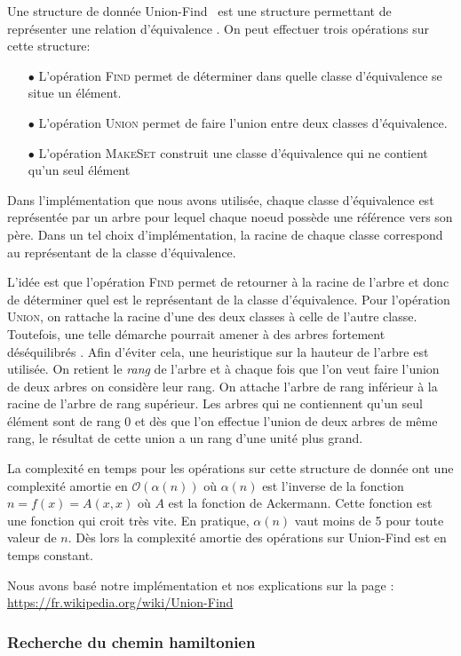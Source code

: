 Une structure de donnée \og Union-Find \fg~est une structure permettant de représenter une relation d'équivalence . On peut effectuer trois opérations sur cette structure:
\begin{itemize}
\item[$\bullet$] L'opération \textsc{Find} permet de déterminer dans quelle classe d'équivalence se situe un élément.
\item[$\bullet$] L'opération \textsc{Union} permet de faire l'union entre deux classes d'équivalence.
\item[$\bullet$] L'opération \textsc{MakeSet} construit une classe d'équivalence qui ne contient qu'un seul élément
\end{itemize}

Dans l'implémentation que nous avons utilisée, chaque classe d'équivalence est représentée par un arbre pour lequel chaque noeud possède une référence vers son père. Dans un tel choix d'implémentation, la racine de chaque classe correspond au représentant de la classe d'équivalence.

L'idée est que l'opération \textsc{Find} permet de retourner à la racine de l'arbre et donc de déterminer quel est le représentant de la classe d'équivalence. Pour l'opération \textsc{Union}, on rattache la racine d'une des deux classes à celle de l'autre classe. Toutefois, une telle démarche pourrait amener à des arbres fortement déséquilibrés . Afin d'éviter cela, une heuristique sur la hauteur de l'arbre est utilisée. On retient le \emph{rang} de l'arbre et à chaque fois que l'on veut faire l'union de deux arbres on considère leur rang. On attache l'arbre de rang inférieur à la racine de l'arbre de rang supérieur. Les arbres qui ne contiennent qu'un seul élément sont de rang 0 et dès que l'on effectue l'union de deux arbres de même rang, le résultat de cette union a un rang d'une unité plus grand.

La complexité en temps pour les opérations sur cette structure de donnée ont une complexité amortie en $\mathcal{O}(\alpha (n))$ où $\alpha(n)$ est l'inverse de la fonction $n = f(x) = A(x,x)$ où $A$ est la fonction de Ackermann. Cette fonction est une fonction qui croit très vite. En pratique, $\alpha(n)$ vaut moins de 5 pour toute valeur de $n$. Dès lors la complexité amortie des opérations sur Union-Find est en temps constant.

Nous avons basé notre implémentation et nos explications sur la page : \url{https://fr.wikipedia.org/wiki/Union-Find}
\subsubsection{Recherche du chemin hamiltonien}

